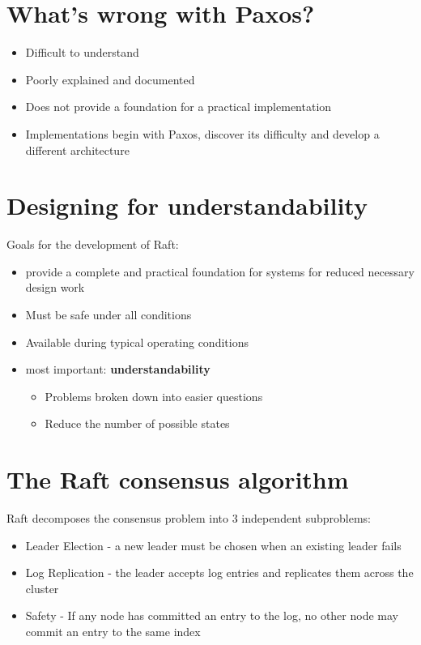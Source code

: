 \documentclass[10pt,a4paper]{article}
\begin{document}
\section{What's wrong with Paxos?}
	\begin{itemize}
		\item Difficult to understand
		\item Poorly explained and documented
		\item Does not provide a foundation for a practical implementation
		\item Implementations begin with Paxos, discover its difficulty and develop a different architecture
	\end{itemize}

\section{Designing for understandability}
	Goals for the development  of Raft:
	\begin{itemize}
		\item provide a complete and practical foundation for systems for reduced necessary design work
		\item Must be safe under all conditions
		\item Available during typical operating conditions
		\item most important: \textbf{understandability}
		\begin{itemize}
			\item Problems broken down into easier questions
			\item Reduce the number of possible states
		\end{itemize}
	\end{itemize}

\section{The Raft consensus algorithm}
	Raft decomposes the consensus problem into 3 independent subproblems:
	\begin{itemize}
		\item Leader Election - a new leader must be chosen when an existing leader fails
		\item Log Replication - the leader accepts log entries and replicates them across the cluster
		\item Safety - If any node has committed an entry to the log, no other node may commit an entry to the same index
	\end{itemize}
\end{document}
